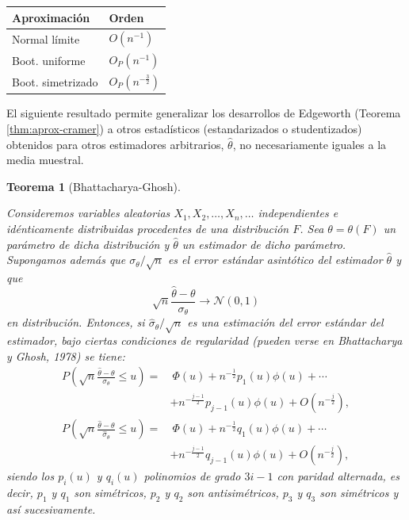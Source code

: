 \documentclass[
]{book}
\newcounter{none} %
\theoremstyle{break}
\newtheorem{theorem}{Teorema}[chapter]
\theoremstyle{nonumberplain}
\begin{document}
{\def\LTcaptype{none} %
\begin{longtable}[]{@{}ll@{}}
\toprule\noalign{}
Aproximación & Orden \\
\midrule\noalign{}
\endhead
\bottomrule\noalign{}
\endlastfoot
Normal límite & \(O\left( n^{-1} \right)\) \\
Boot. uniforme & \(O_{P}\left( n^{-1} \right)\) \\
Boot. simetrizado & \(O_{P}\left( n^{-\frac{3}{2}} \right)\) \\
\end{longtable}
}

El siguiente resultado permite generalizar los desarrollos de Edgeworth
(Teorema \ref{thm:aprox-cramer})
a otros estadísticos (estandarizados o studentizados) obtenidos para
otros estimadores arbitrarios, \(\hat{\theta}\), no necesariamente iguales
a la media muestral.

\begin{theorem}[Bhattacharya-Ghosh]
\protect\hypertarget{thm:aprox-bhat-gho}{}\label{thm:aprox-bhat-gho} \vspace{0.5cm}

Consideremos variables aleatorias \(X_1,X_2,\ldots ,X_n,\ldots\) independientes e idénticamente distribuidas procedentes de una distribución \(F\). Sea \(\theta =\theta\left( F \right)\) un parámetro de dicha distribución y \(\hat{\theta}\) un estimador de dicho parámetro.
Supongamos además que \(\sigma_{\theta} / \sqrt{n}\) es el error estándar asintótico del estimador \(\hat{\theta}\) y que
\[\sqrt{n}\frac{\hat{\theta}-\theta }{\sigma_{\theta }} \rightarrow \mathcal{N}(0,1)\]
en distribución.
Entonces, si \(\hat{\sigma}_{\theta} / \sqrt{n}\) es una estimación del error estándar del estimador, bajo ciertas condiciones de regularidad (pueden verse en Bhattacharya y Ghosh, 1978) se tiene:
\[\begin{aligned}
P\left( \sqrt{n}\frac{\hat{\theta}-\theta }{\sigma _{\theta }}\leq u \right)
= &\ \Phi \left( u \right) +n^{-\frac{1}{2}}p_1\left( u \right) \phi \left(
u \right) +\cdots \\
& +n^{-\frac{j-1}{2}}p_{j-1}\left( u \right) \phi \left( u \right) +O\left(
n^{-\frac{j}{2}} \right), \\
P\left( \sqrt{n}\frac{\hat{\theta}-\theta }{\hat{\sigma}_{\theta }}\leq
u \right) = &\ \Phi \left( u \right) +n^{-\frac{1}{2}}q_1\left( u \right) \phi
\left( u \right) +\cdots \\
& +n^{-\frac{j-1}{2}}q_{j-1}\left( u \right) \phi \left( u \right) +O\left(
n^{-\frac{j}{2}} \right),\end{aligned}\]
siendo los \(p_i\left( u \right)\) y \(q_i\left( u \right)\) polinomios
de grado \(3i-1\) con paridad alternada, es decir, \(p_1\) y \(q_1\) son
simétricos, \(p_2\) y \(q_2\) son antisimétricos, \(p_3\) y \(q_3\) son
simétricos y así sucesivamente.
\end{theorem}
\end{document}
